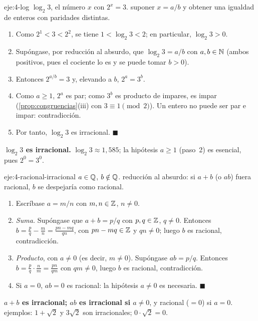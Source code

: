 \begin{solucion}{eje:4-log}
\datos $\log_2 3$, el número $x$ con $2^{x}=3$.
\planteamiento suponer $x=a/b$ y obtener una igualdad de enteros con paridades distintas.
\pasos
\begin{enumerate}[label=\arabic*.]
  \item Como $2^{1}<3<2^{2}$, se tiene $1<\log_2 3<2$; en particular, $\log_2 3>0$.
  \item Supóngase, por reducción al absurdo, que $\log_2 3=a/b$ con $a,b\in\mathbb{N}$ (ambos positivos, pues el cociente lo es y se puede tomar $b>0$).
  \item Entonces $2^{a/b}=3$ y, elevando a $b$, $2^{a}=3^{b}$.
  \item Como $a\ge 1$, $2^{a}$ es par; como $3^{b}$ es producto de impares, es impar (\cref{prop:congruencias}(iii) con $3\equiv 1\pmod 2$). Un entero no puede ser par e impar: contradicción.
  \item Por tanto, $\log_2 3$ es irracional. $\blacksquare$
\end{enumerate}
\resultado \textbf{$\log_2 3$ es irracional.}
\comprobacion $\log_2 3\approx 1{,}585$; la hipótesis $a\ge 1$ (paso~2) es esencial, pues $2^{0}=3^{0}$.
\end{solucion}

\begin{solucion}{eje:4-racional-irracional}
\datos $a\in\mathbb{Q}$, $b\notin\mathbb{Q}$.
\planteamiento reducción al absurdo: si $a+b$ (o $ab$) fuera racional, $b$ se despejaría como racional.
\pasos
\begin{enumerate}[label=\arabic*.]
  \item Escríbase $a=m/n$ con $m,n\in\mathbb{Z}$, $n\neq 0$.
  \item \emph{Suma.} Supóngase que $a+b=p/q$ con $p,q\in\mathbb{Z}$, $q\neq 0$. Entonces $b=\frac{p}{q}-\frac{m}{n}=\frac{pn-mq}{qn}$, con $pn-mq\in\mathbb{Z}$ y $qn\neq 0$; luego $b$ es racional, contradicción.
  \item \emph{Producto}, con $a\neq 0$ (es decir, $m\neq 0$). Supóngase $ab=p/q$. Entonces $b=\frac{p}{q}\cdot\frac{n}{m}=\frac{pn}{qm}$ con $qm\neq 0$, luego $b$ es racional, contradicción.
  \item Si $a=0$, $ab=0$ es racional: la hipótesis $a\neq 0$ es necesaria. $\blacksquare$
\end{enumerate}
\resultado \textbf{$a+b$ es irracional; $ab$ es irracional si $a\neq 0$}, y racional ($=0$) si $a=0$.
\comprobacion ejemplos: $1+\sqrt2$ y $3\sqrt2$ son irracionales; $0\cdot\sqrt2=0$.
\end{solucion}

